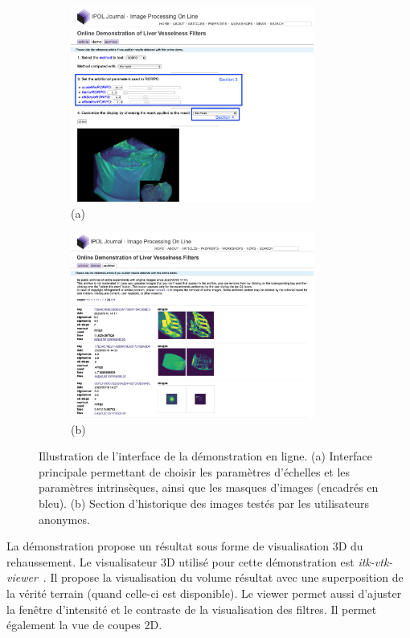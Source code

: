 \begin{figure}[!ht]
    \begin{subfigure}{0.45\textwidth}
        \centering
        \includegraphics[width=8cm]{Images/visuBenchmarkDemos.png}
        \caption{(a)}
    \end{subfigure}
    \begin{subfigure}{0.45\textwidth}
        \centering
        \includegraphics[width=8cm]{Images/visuBenchmarkDemosArchivesTrim.png}
        \caption{(b)}
    \end{subfigure}

    \caption{Illustration de l'interface de la démonstration en ligne. (a) Interface principale permettant de choisir les paramètres d'échelles et les paramètres intrinsèques, ainsi que les masques d'images (encadrés en bleu). (b) Section d'historique des images testés par les utilisateurs anonymes.}
\label{Fig:DemoExample}
\end{figure}

La démonstration propose un résultat sous forme de visualisation 3D du rehaussement. Le visualisateur 3D utilisé pour cette démonstration est \textit{itk-vtk-viewer}~\cite{Mccormick2020_Visu3DDemo}. Il propose la visualisation du volume résultat avec une superposition de la vérité terrain (quand celle-ci est disponible). Le viewer permet aussi d'ajuster la fenêtre d'intensité et le contraste de la visualisation des filtres. Il permet également la vue de coupes 2D.

